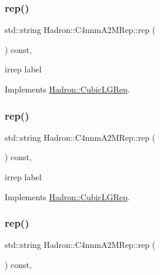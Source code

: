 \subsubsection{\texorpdfstring{rep()}{rep()}\hspace{0.1cm}{\footnotesize\ttfamily [1/3]}}
{\footnotesize\ttfamily std\+::string Hadron\+::\+C4nnm\+A2\+M\+Rep\+::rep (\begin{DoxyParamCaption}{ }\end{DoxyParamCaption}) const\hspace{0.3cm}{\ttfamily [inline]}, {\ttfamily [virtual]}}

irrep label 

Implements \mbox{\hyperlink{structHadron_1_1CubicLGRep_a50f5ddbb8f4be4cee0106fa9e8c75e6c}{Hadron\+::\+Cubic\+L\+G\+Rep}}.

\mbox{\label{structHadron_1_1C4nnmA2MRep_a08a21eab24db1e7b93cde52766cfee0b}} 
\subsubsection{\texorpdfstring{rep()}{rep()}\hspace{0.1cm}{\footnotesize\ttfamily [2/3]}}
{\footnotesize\ttfamily std\+::string Hadron\+::\+C4nnm\+A2\+M\+Rep\+::rep (\begin{DoxyParamCaption}{ }\end{DoxyParamCaption}) const\hspace{0.3cm}{\ttfamily [inline]}, {\ttfamily [virtual]}}

irrep label 

Implements \mbox{\hyperlink{structHadron_1_1CubicLGRep_a50f5ddbb8f4be4cee0106fa9e8c75e6c}{Hadron\+::\+Cubic\+L\+G\+Rep}}.

\mbox{\label{structHadron_1_1C4nnmA2MRep_a08a21eab24db1e7b93cde52766cfee0b}} 
\subsubsection{\texorpdfstring{rep()}{rep()}\hspace{0.1cm}{\footnotesize\ttfamily [3/3]}}
{\footnotesize\ttfamily std\+::string Hadron\+::\+C4nnm\+A2\+M\+Rep\+::rep (\begin{DoxyParamCaption}{ }\end{DoxyParamCaption}) const\hspace{0.3cm}{\ttfamily [inline]}, {\ttfamily [virtual]}}

